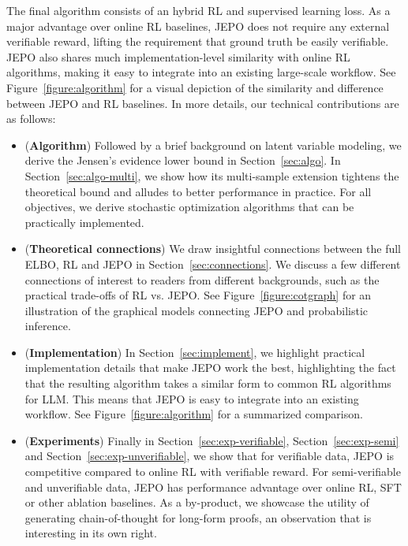 \documentclass{article}
\theoremstyle{definition}
\begin{document}
The final algorithm consists of an hybrid RL and supervised learning loss. As a major advantage over online RL baselines, JEPO does not require any external verifiable reward, lifting the requirement that ground truth be easily verifiable. JEPO also shares much implementation-level similarity with online RL algorithms, making it easy to integrate into an existing large-scale workflow. See Figure~\ref{figure:algorithm} for a visual depiction of the similarity and difference between JEPO and RL baselines. In more details, our technical contributions are as follows:
\begin{itemize}
    \item (\textbf{Algorithm}) Followed by a brief background on latent variable modeling, we derive the Jensen's evidence lower bound in Section~\ref{sec:algo}. In Section~\ref{sec:algo-multi}, we show how its multi-sample extension \citep{burda2015importance} tightens the theoretical bound and alludes to better performance in practice. For all objectives, we derive stochastic optimization algorithms that can be practically implemented.
    \item (\textbf{Theoretical connections}) We draw insightful connections between the full ELBO, RL and JEPO in Section~\ref{sec:connections}. We discuss a few different connections of interest to readers from different backgrounds, such as the practical trade-offs of RL vs. JEPO. See Figure~\ref{figure:cotgraph} for an illustration of the graphical models connecting JEPO and probabilistic inference.
    \item (\textbf{Implementation}) In Section~\ref{sec:implement}, we highlight practical implementation details that make JEPO work the best, highlighting the fact that the resulting algorithm takes a similar form to common RL algorithms for LLM. This means that JEPO is easy to integrate into an existing workflow. See Figure~\ref{figure:algorithm} for a summarized comparison. 
    \item (\textbf{Experiments}) Finally in Section~\ref{sec:exp-verifiable}, Section~\ref{sec:exp-semi} and Section~\ref{sec:exp-unverifiable}, we show that for verifiable data, JEPO is competitive compared to online RL with verifiable reward. For semi-verifiable and unverifiable data, JEPO has performance advantage over online RL, SFT or other ablation baselines. As a by-product, we showcase the utility of generating chain-of-thought for long-form proofs, an observation that is interesting in its own right.
\end{itemize}
\end{document}
